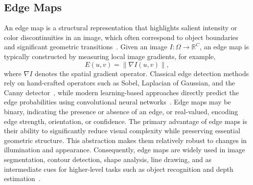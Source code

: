 \subsection{Edge Maps}
\label{subsec:p-2-sec-4-2D-edge-maps}
An edge map is a structural representation that highlights salient intensity or color discontinuities in an image, which often correspond to object boundaries and significant geometric transitions~\cite{canny1986}.
Given an image $I: \Omega \rightarrow \mathbb{R}^C$, an edge map is typically constructed by measuring local image gradients, for example,
\begin{equation}
E(u,v) = \|\nabla I(u,v)\|,
\end{equation}
where $\nabla I$ denotes the spatial gradient operator.
Classical edge detection methods rely on hand-crafted operators such as Sobel, Laplacian of Gaussian, and the Canny detector~\cite{canny1986}, while modern learning-based approaches directly predict the edge probabilities using convolutional neural networks~\cite{xie2015hed}.
Edge maps may be binary, indicating the presence or absence of an edge, or real-valued, encoding edge strength, orientation, or confidence.
The primary advantage of edge maps is their ability to significantly reduce visual complexity while preserving essential geometric structure.
This abstraction makes them relatively robust to changes in illumination and appearance. 
Consequently, edge maps are widely used in image
segmentation, contour detection, shape analysis, line drawing, and as intermediate cues for higher-level tasks such as object recognition and depth estimation~\cite{szeliski2022}.


